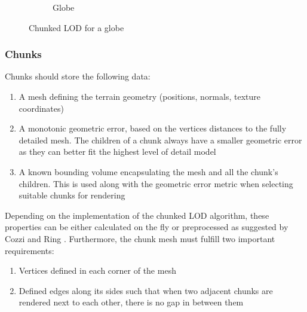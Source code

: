 \begin{figure}[htbp]
\begin{subfigure}[b]{0.2\textwidth}
        \caption{Globe}
    \end{subfigure}
    \caption{Chunked LOD for a globe}
    \label{fig:chunkedlod}
\end{figure}

\subsubsection{Chunks}
Chunks should store the following data:

\begin{enumerate}
    \item A mesh defining the terrain geometry (positions, normals, texture coordinates) 
    \item A monotonic geometric error, based on the vertices distances to the fully detailed mesh. The children of a chunk always have a smaller geometric error as they can better fit the highest level of detail model
    \item A known bounding volume encapsulating the mesh and all the chunk's children. This is used along with the geometric error metric when selecting suitable chunks for rendering
\end{enumerate}

Depending on the implementation of the chunked LOD algorithm, these properties can be either calculated on the fly or preprocessed as suggested by Cozzi and Ring \cite[p. 447]{cozzi11}. Furthermore, the chunk mesh must fulfill two important requirements: 

\begin{enumerate}
    \item Vertices defined in each corner of the mesh
    \item Defined edges along its sides such that when two adjacent chunks are rendered next to each other, there is no gap in between them
\end{enumerate}

